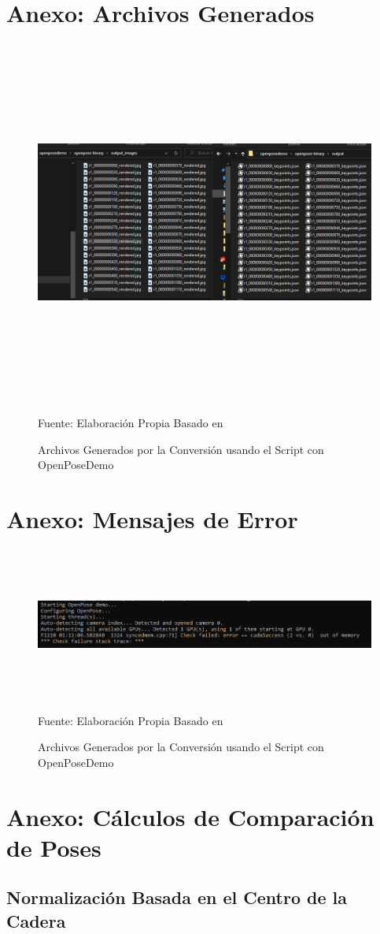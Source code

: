 \begin{landscape}
	\clearpage
	\section{Anexo: Archivos Generados}
	\begin{figure}[b!]
		\centering
			\includegraphics[width=22cm,height=12cm,]{./Images/JSONandJPGexample.png}
		\caption{Archivos Generados por la Conversión usando el Script con OpenPoseDemo}
		\footnotesize Fuente: Elaboración Propia Basado en \cite{8765346}
		\label{videotojsonpjg}
	\end{figure}
\clearpage
\section{Anexo: Mensajes de Error}
	\begin{figure}[h!]
		\centering
		\includegraphics[width=22cm,height=5cm,]{./Images/erroroutofmemory.png}
		\caption{Archivos Generados por la Conversión usando el Script con OpenPoseDemo}
		\footnotesize Fuente: Elaboración Propia Basado en \cite{8765346}
		\label{erroroutofmemory}
	\end{figure}
\end{landscape}

\clearpage
\section{Anexo: Cálculos de Comparación de Poses}


\subsection{Normalización Basada en el Centro de la Cadera}




